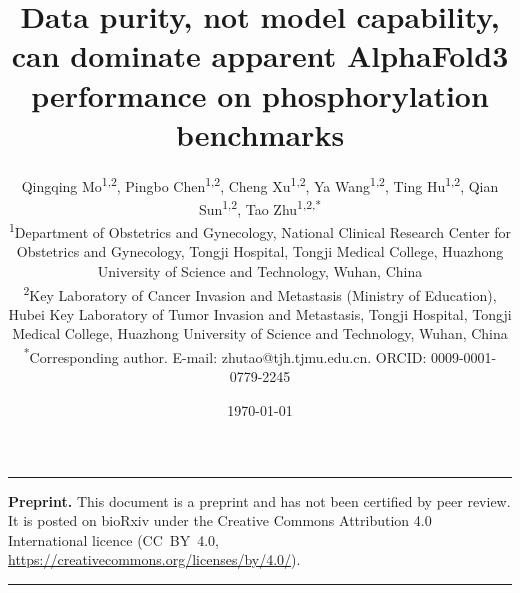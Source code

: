 \documentclass[11pt]{article}
\title{\textbf{Data purity, not model capability, can dominate apparent
AlphaFold3 performance on phosphorylation benchmarks}}
\author{%
\parbox{0.92\textwidth}{\centering
Qingqing Mo\textsuperscript{1,2},
Pingbo Chen\textsuperscript{1,2},
Cheng Xu\textsuperscript{1,2},
Ya Wang\textsuperscript{1,2},
Ting Hu\textsuperscript{1,2},
Qian Sun\textsuperscript{1,2},
Tao Zhu\textsuperscript{1,2,*}\\[4pt]
\small \textsuperscript{1}Department of Obstetrics and Gynecology, National Clinical Research Center for Obstetrics and Gynecology, Tongji Hospital, Tongji Medical College, Huazhong University of Science and Technology, Wuhan, China\\
\small \textsuperscript{2}Key Laboratory of Cancer Invasion and Metastasis (Ministry of Education), Hubei Key Laboratory of Tumor Invasion and Metastasis, Tongji Hospital, Tongji Medical College, Huazhong University of Science and Technology, Wuhan, China\\[4pt]
\small \textsuperscript{*}Corresponding author. E-mail: zhutao@tjh.tjmu.edu.cn. ORCID: 0009-0001-0779-2245}%
}
\date{\today}
\begin{document}
\maketitle

\noindent\rule{\linewidth}{0.4pt}\par
{\small\noindent\textbf{Preprint.} This document is a preprint and has not been
certified by peer review. It is posted on bioRxiv under the Creative Commons
Attribution 4.0 International licence (CC~BY~4.0,
\url{https://creativecommons.org/licenses/by/4.0/}).}\par
\noindent\rule{\linewidth}{0.4pt}
\vspace{1em}
\end{document}

